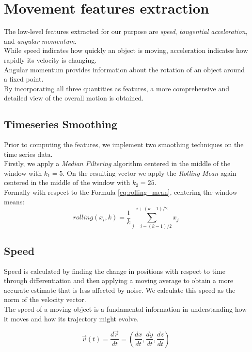 \section{Movement features extraction}
\label{sec:features}
The low-level features extracted for our purpose are \textit{speed}, \textit{tangential acceleration}, and \textit{angular momentum}. \\
While speed indicates how quickly an object is moving, acceleration indicates how rapidly its velocity is changing.\\
Angular momentum provides information about the rotation of an object around a fixed point.\\
By incorporating all three quantities as features, a more comprehensive and detailed view of the overall motion is obtained.

\subsection{Timeseries Smoothing}
Prior to computing the features, we implement two smoothing techniques on the time series data. \\
Firstly, we apply a \textit{Median Filtering} algorithm centered in the middle of the window with $k_1 = 5$. 
On the resulting vector we apply the \textit{Rolling Mean} again centered in the middle of the window with $k_2 = 25 $. \\
Formally with respect to the Formula \ref{eq:rolling_mean}, centering the window means:
\begin{equation}
  rolling(x_i,k) = \frac{1}{k} \sum_{j=i-(k-1)/2}^{i+(k-1)/2} x_j
\end{equation}

\subsection{Speed}
Speed is calculated by finding the change in positions with respect to time through differentiation and then applying a moving average to obtain a more accurate estimate that is less affected by noise.
We calculate this speed as the norm of the velocity vector. \\
The speed of a moving object is a fundamental information in understanding how it moves and how its trajectory might evolve.

\begin{equation}
  \vec{v}(t) = \frac{d\vec{r}}{dt} = \left(\frac{dx}{dt}, \frac{dy}{dt}, \frac{dz}{dt}\right)
\end{equation}

